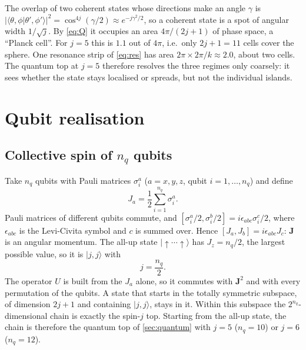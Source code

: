 \documentclass[11pt,a4paper]{article}
\begin{document}
The overlap of two coherent states whose directions make an angle $\gamma$ is
$|\langle\theta,\phi|\theta',\phi'\rangle|^2 = \cos^{4j}(\gamma/2)\approx e^{-j\gamma^2/2}$, so a coherent state is
a spot of angular width $1/\sqrt j$. By \cref{eq:Q} it occupies an area $4\pi/(2j+1)$ of phase space, a ``Planck
cell''. For $j=5$ this is $1.1$ out of $4\pi$, i.e.\ only $2j+1=11$ cells cover the sphere. One resonance strip of
\cref{eq:res} has area $2\pi\times2\pi/k\approx2.0$, about two cells. The quantum top at $j=5$ therefore resolves
the three regimes only coarsely: it sees whether the state stays localised or spreads, but not the individual islands.

\section{Qubit realisation}\label{sec:qubits}

\subsection{Collective spin of \texorpdfstring{$n_q$}{n\_q} qubits}

Take $n_q$ qubits with Pauli matrices $\sigma^a_i$ ($a=x,y,z$, qubit $i=1,\dots,n_q$) and define
\begin{equation}\label{eq:Jq}
  J_a = \frac12\sum_{i=1}^{n_q}\sigma^a_i .
\end{equation}
Pauli matrices of different qubits commute, and $[\sigma^a_i/2,\sigma^b_i/2]=i\epsilon_{abc}\sigma^c_i/2$, where
$\epsilon_{abc}$ is the Levi-Civita symbol and $c$ is summed over. Hence $[J_a,J_b]=i\epsilon_{abc}J_c$: $\bm J$ is
an angular momentum. The all-up state $|{\uparrow\cdots\uparrow}\rangle$ has $J_z=n_q/2$, the largest possible value,
so it is $|j,j\rangle$ with
\begin{equation}
  j = \frac{n_q}{2}.
\end{equation}
The operator $U$ is built from the $J_a$ alone, so it commutes with $\bm J^2$ and with every permutation of the qubits.
A state that starts in the totally symmetric subspace, of dimension $2j+1$ and containing $|j,j\rangle$, stays in it.
Within this subspace the $2^{n_q}$-dimensional chain is exactly the spin-$j$ top. Starting from the all-up state, the
chain is therefore the quantum top of \cref{sec:quantum} with $j=5$ ($n_q=10$) or $j=6$ ($n_q=12$).
\end{document}
